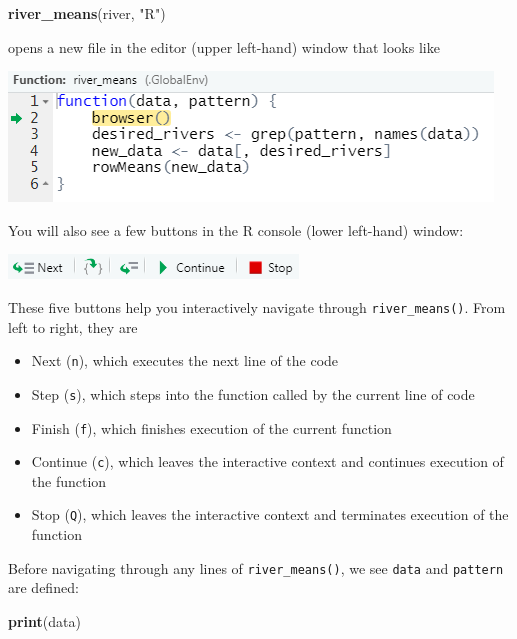 \documentclass[
]{book}
\newenvironment{Shaded}{\begin{snugshade}}{\end{snugshade}}
\newcommand{\KeywordTok}[1]{\textcolor[rgb]{0.13,0.29,0.53}{\textbf{#1}}}
\newcommand{\NormalTok}[1]{#1}
\newcommand{\StringTok}[1]{\textcolor[rgb]{0.31,0.60,0.02}{#1}}
\providecommand{\tightlist}{%
  \setlength{\itemsep}{0pt}\setlength{\parskip}{0pt}}
\begin{document}
\begin{Shaded}
\begin{Highlighting}[]
\KeywordTok{river_means}\NormalTok{(river, }\StringTok{"R"}\NormalTok{)}
\end{Highlighting}
\end{Shaded}

opens a new file in the editor (upper left-hand) window that looks like

\includegraphics[width=0.75\linewidth]{images/newrpack_files7}

You will also see a few buttons in the R console (lower left-hand) window:

\includegraphics[width=0.75\linewidth]{images/newrpack_files8}

These five buttons help you interactively navigate through \texttt{river\_means()}. From left to right, they are

\begin{itemize}
\tightlist
\item
  Next (\texttt{n}), which executes the next line of the code
\item
  Step (\texttt{s}), which steps into the function called by the current line of code
\item
  Finish (\texttt{f}), which finishes execution of the current function
\item
  Continue (\texttt{c}), which leaves the interactive context and continues execution of the function
\item
  Stop (\texttt{Q}), which leaves the interactive context and terminates execution of the function
\end{itemize}

Before navigating through any lines of \texttt{river\_means()}, we see \texttt{data} and \texttt{pattern} are defined:

\begin{Shaded}
\begin{Highlighting}[]
\KeywordTok{print}\NormalTok{(data)}
\end{Highlighting}
\end{Shaded}
\end{document}
